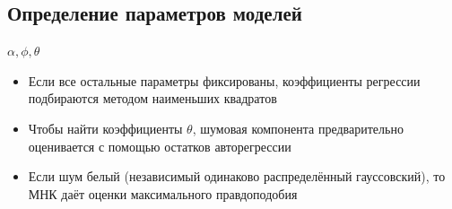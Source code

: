 \documentclass[9pt,pdf,utf8,hyperref={unicode},aspectratio=169]{beamer}
\begin{document}
\subsection{Определение параметров моделей}
\begin{frame}{$\alpha, \phi, \theta$}
	\begin{itemize}
		\item Если все остальные параметры фиксированы, коэффициенты регрессии подбираются методом наименьших квадратов
		\item Чтобы найти коэффициенты $\theta$, шумовая компонента предварительно оценивается с помощью остатков авторегрессии
		\item Если шум белый (независимый одинаково распределённый гауссовский), то МНК даёт оценки максимального правдоподобия
	\end{itemize}
\end{frame}
\end{document}
